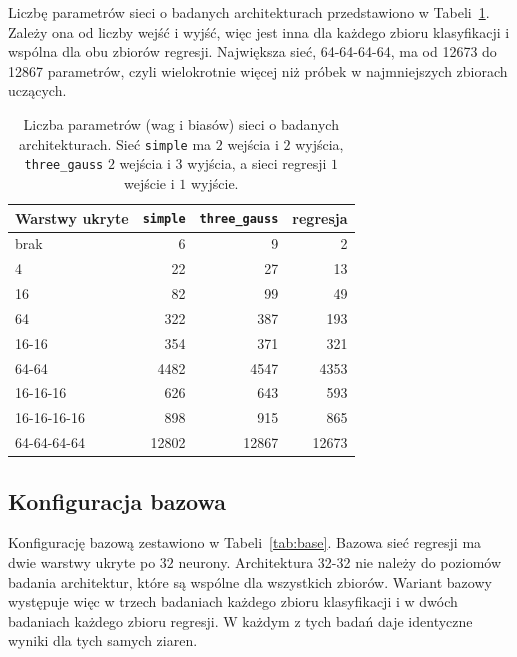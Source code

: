 Liczbę parametrów sieci o badanych architekturach przedstawiono w Tabeli~\ref{tab:architecture-params}. Zależy ona od liczby wejść i wyjść, więc jest inna dla każdego zbioru klasyfikacji i wspólna dla obu zbiorów regresji. Największa sieć, 64-64-64-64, ma od \num{12673} do \num{12867} parametrów, czyli wielokrotnie więcej niż próbek w najmniejszych zbiorach uczących.

\begin{table}[H]
    \centering
    \caption{Liczba parametrów (wag i biasów) sieci o badanych architekturach. Sieć \texttt{simple} ma $2$ wejścia i $2$ wyjścia, \texttt{three\_gauss} $2$ wejścia i $3$ wyjścia, a sieci regresji $1$ wejście i $1$ wyjście.}
    \label{tab:architecture-params}
    \begin{tabular}{lrrr}
        \toprule
        Warstwy ukryte & \texttt{simple} & \texttt{three\_gauss} & regresja \\
        \midrule
        brak & \num{6} & \num{9} & \num{2} \\
        4 & \num{22} & \num{27} & \num{13} \\
        16 & \num{82} & \num{99} & \num{49} \\
        64 & \num{322} & \num{387} & \num{193} \\
        16-16 & \num{354} & \num{371} & \num{321} \\
        64-64 & \num{4482} & \num{4547} & \num{4353} \\
        16-16-16 & \num{626} & \num{643} & \num{593} \\
        16-16-16-16 & \num{898} & \num{915} & \num{865} \\
        64-64-64-64 & \num{12802} & \num{12867} & \num{12673} \\
        \bottomrule
    \end{tabular}
\end{table}

\subsection{Konfiguracja bazowa}
\label{sec:methodology-base}

Konfigurację bazową zestawiono w Tabeli~\ref{tab:base}. Bazowa sieć regresji ma dwie warstwy ukryte po $32$ neurony. Architektura 32-32 nie należy do poziomów badania architektur, które są wspólne dla wszystkich zbiorów. Wariant bazowy występuje więc w trzech badaniach każdego zbioru klasyfikacji i w dwóch badaniach każdego zbioru regresji. W każdym z tych badań daje identyczne wyniki dla tych samych ziaren.


